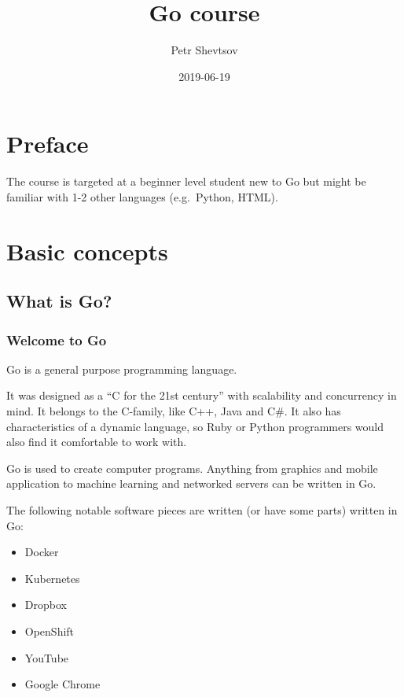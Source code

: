 \documentclass[]{book}
\title{Go course}
\author{Petr Shevtsov}
\date{2019-06-19}
\providecommand{\tightlist}{%
  \setlength{\itemsep}{0pt}\setlength{\parskip}{0pt}}
\begin{document}
\maketitle

{
\setcounter{tocdepth}{1}
\tableofcontents
}
\hypertarget{preface}{%
\chapter*{Preface}\label{preface}}

The course is targeted at a beginner level student new to Go but might be
familiar with 1-2 other languages (e.g.~Python, HTML).

\hypertarget{basic-concepts}{%
\chapter{Basic concepts}\label{basic-concepts}}

\hypertarget{what-is-go}{%
\section{What is Go?}\label{what-is-go}}

\hypertarget{welcome-to-go}{%
\subsection{Welcome to Go}\label{welcome-to-go}}

Go is a general purpose programming language.

It was designed as a ``C for the 21st century'' with scalability and concurrency
in mind. It belongs to the C-family, like C++, Java and C\#. It also has
characteristics of a dynamic language, so Ruby or Python programmers would also
find it comfortable to work with.

Go is used to create computer programs. Anything from graphics and mobile
application to machine learning and networked servers can be written in Go.

The following notable software pieces are written (or have some parts) written
in Go:

\begin{itemize}
\tightlist
\item
  Docker
\item
  Kubernetes
\item
  Dropbox
\item
  OpenShift
\item
  YouTube
\item
  Google Chrome
\end{itemize}
\end{document}
